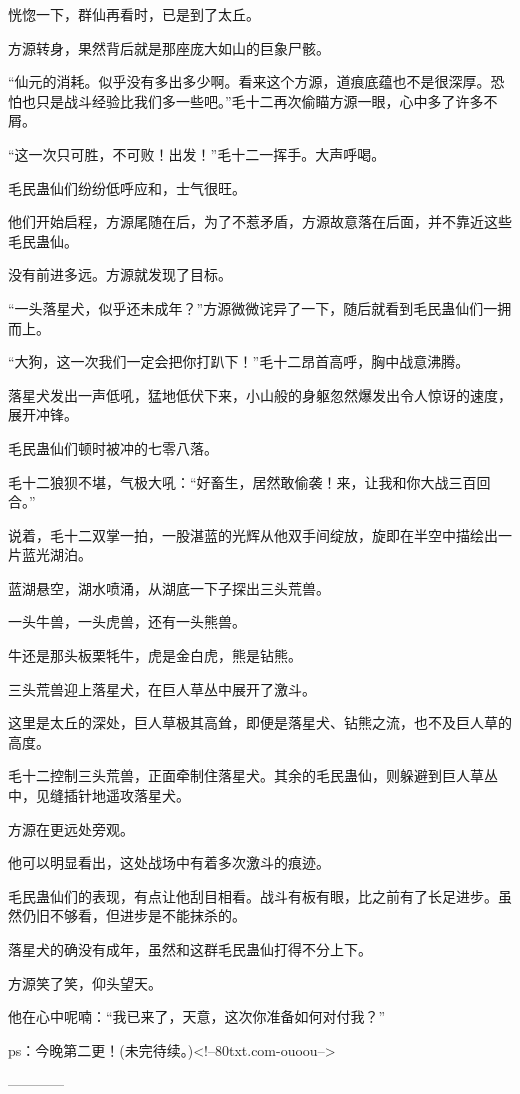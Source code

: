 \begin{this_body}
恍惚一下，群仙再看时，已是到了太丘。

方源转身，果然背后就是那座庞大如山的巨象尸骸。

“仙元的消耗。似乎没有多出多少啊。看来这个方源，道痕底蕴也不是很深厚。恐怕也只是战斗经验比我们多一些吧。”毛十二再次偷瞄方源一眼，心中多了许多不屑。

“这一次只可胜，不可败！出发！”毛十二一挥手。大声呼喝。

毛民蛊仙们纷纷低呼应和，士气很旺。

他们开始启程，方源尾随在后，为了不惹矛盾，方源故意落在后面，并不靠近这些毛民蛊仙。

没有前进多远。方源就发现了目标。

“一头落星犬，似乎还未成年？”方源微微诧异了一下，随后就看到毛民蛊仙们一拥而上。

“大狗，这一次我们一定会把你打趴下！”毛十二昂首高呼，胸中战意沸腾。

落星犬发出一声低吼，猛地低伏下来，小山般的身躯忽然爆发出令人惊讶的速度，展开冲锋。

毛民蛊仙们顿时被冲的七零八落。

毛十二狼狈不堪，气极大吼：“好畜生，居然敢偷袭！来，让我和你大战三百回合。”

说着，毛十二双掌一拍，一股湛蓝的光辉从他双手间绽放，旋即在半空中描绘出一片蓝光湖泊。

蓝湖悬空，湖水喷涌，从湖底一下子探出三头荒兽。

一头牛兽，一头虎兽，还有一头熊兽。

牛还是那头板栗牦牛，虎是金白虎，熊是钻熊。

三头荒兽迎上落星犬，在巨人草丛中展开了激斗。

这里是太丘的深处，巨人草极其高耸，即便是落星犬、钻熊之流，也不及巨人草的高度。

毛十二控制三头荒兽，正面牵制住落星犬。其余的毛民蛊仙，则躲避到巨人草丛中，见缝插针地遥攻落星犬。

方源在更远处旁观。

他可以明显看出，这处战场中有着多次激斗的痕迹。

毛民蛊仙们的表现，有点让他刮目相看。战斗有板有眼，比之前有了长足进步。虽然仍旧不够看，但进步是不能抹杀的。

落星犬的确没有成年，虽然和这群毛民蛊仙打得不分上下。

方源笑了笑，仰头望天。

他在心中呢喃：“我已来了，天意，这次你准备如何对付我？”

ps：今晚第二更！(未完待续。)<!--80txt.com-ouoou-->

------------

\end{this_body}

